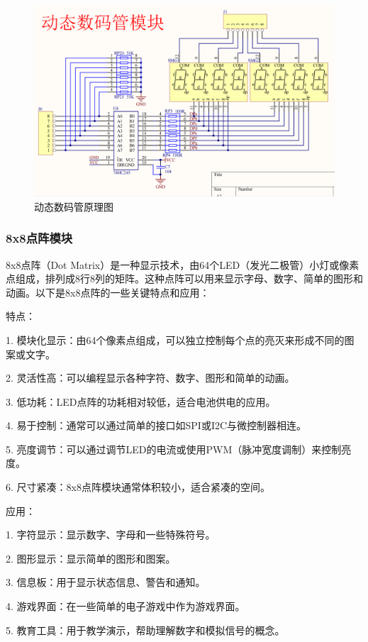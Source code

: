 \documentclass{textreportclass}  %
\begin{document}
	
	\begin{figure}[htbp]
		\centering
		\includegraphics[scale=0.4]{Fig/动态数码管原理图.png}
		\caption{动态数码管原理图}\label{Fig.20}
	\end{figure}
	
\subsubsection{8x8点阵模块}						   %
	8x8点阵（Dot Matrix）是一种显示技术，由64个LED（发光二极管）小灯或像素点组成，排列成8行8列的矩阵。这种点阵可以用来显示字母、数字、简单的图形和动画。以下是8x8点阵的一些关键特点和应用：
	
	特点：
	
	1. 模块化显示：由64个像素点组成，可以独立控制每个点的亮灭来形成不同的图案或文字。
	
	2. 灵活性高：可以编程显示各种字符、数字、图形和简单的动画。
	
	3. 低功耗：LED点阵的功耗相对较低，适合电池供电的应用。
	
	4. 易于控制：通常可以通过简单的接口如SPI或I2C与微控制器相连。
	
	5. 亮度调节：可以通过调节LED的电流或使用PWM（脉冲宽度调制）来控制亮度。
	
	6. 尺寸紧凑：8x8点阵模块通常体积较小，适合紧凑的空间。
	
	应用：
	
	1. 字符显示：显示数字、字母和一些特殊符号。
	
	2. 图形显示：显示简单的图形和图案。
	
	3. 信息板：用于显示状态信息、警告和通知。
	
	4. 游戏界面：在一些简单的电子游戏中作为游戏界面。
	
	5. 教育工具：用于教学演示，帮助理解数字和模拟信号的概念。
	
\end{document}

